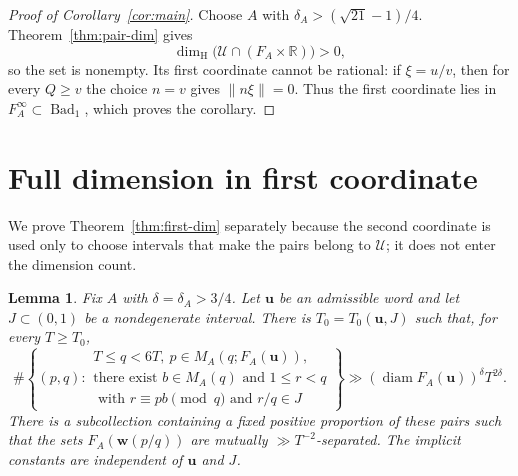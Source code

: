 \documentclass[11pt]{amsart}
\newtheorem{lemma}[theorem]{Lemma}
\newcommand{\R}{\mathbb R}
\newcommand{\Bad}{\operatorname{Bad}}
\newcommand{\diam}{\operatorname{diam}}
\newcommand{\dimH}{\dim_{\mathrm H}}
\begin{document}
\begin{proof}[Proof of Corollary~\ref{cor:main}]
Choose $A$ with $\delta_A>(\sqrt{21}-1)/4$.  Theorem~\ref{thm:pair-dim} gives
$$
 \dimH\bigl(\mathcal U\cap(F_A\times\R)\bigr)>0,
$$
so the set is nonempty.  Its first coordinate cannot be rational: if
$\xi=u/v$, then for every $Q\ge v$ the choice $n=v$ gives $\|n\xi\|=0$.
Thus the first coordinate lies in $F_A^\infty\subset\Bad_1$, which proves the
corollary.
\end{proof}


\section{Full dimension in first coordinate}\label{sec:first-coordinate}

We prove Theorem~\ref{thm:first-dim} separately because the second coordinate
is used only to choose intervals that make the pairs belong to $\mathcal U$;
it does not enter the dimension count.

\begin{lemma}\label{lem:many-good-p}
Fix $A$ with $\delta=\delta_A>3/4$.  Let $\mathbf{u}$ be an admissible word and let
$J\subset(0,1)$ be a nondegenerate interval.  There is
$T_0=T_0(\mathbf{u},J)$ such that, for every $T\ge T_0$,
\begin{equation}\label{eq:many-good-uniform}
 \#\left\{(p,q):
 \begin{array}{l}
 T\le q<6T,\ p\in M_A(q;F_A(\mathbf{u})),\\
 \text{there exist }b\in M_A(q)\text{ and }1\le r<q\\
 \text{ with }r\equiv pb\pmod q\text{ and }r/q\in J
 \end{array}\right\}
 \gg (\diam F_A(\mathbf{u}))^\delta T^{2\delta}.
\end{equation}
There is a subcollection containing a fixed positive proportion of these pairs
such that the sets
$F_A(\mathbf{w}(p/q))$ are mutually $\gg T^{-2}$-separated.  The implicit constants are independent of $\mathbf{u}$ and $J$.
\end{lemma}
\end{document}
